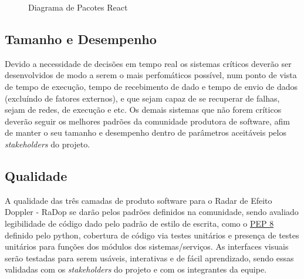 \begin{figure}[!htb]
    \caption{\label{fig:diagrama-pact-react}Diagrama de Pacotes React}
\end{figure}

\subsection{Tamanho e Desempenho}\label{tamanho-e-desempenho}

Devido a necessidade de decisões em tempo real os sistemas críticos
deverão ser desenvolvidos de modo a serem o mais perfomáticos possível,
num ponto de vista de tempo de execução, tempo de recebimento de dado e
tempo de envio de dados (excluíndo de fatores externos), e que sejam
capaz de se recuperar de falhas, sejam de redes, de execução e etc. Os
demais sistemas que não forem críticos deverão seguir os melhores
padrões da comunidade produtora de software, afim de manter o seu
tamanho e desempenho dentro de parâmetros aceitáveis pelos
\emph{stakeholders} do projeto.

\subsection{Qualidade}\label{qualidade}

A qualidade das três camadas de produto software para o Radar de Efeito
Doppler - RaDop se darão pelos padrões definidos na comunidade, sendo
avaliado legibilidade de código dado pelo padrão de estilo de escrita,
como o \href{https://www.python.org/dev/peps/pep-0008/}{PEP 8} definido
pelo python, cobertura de código via testes unitários e presença de
testes unitários para funções dos módulos dos sistemas/serviços. As
interfaces visuais serão testadas para serem usáveis, interativas e de
fácil aprendizado, sendo essas validadas com os \emph{stakeholders} do
projeto e com os integrantes da equipe.
